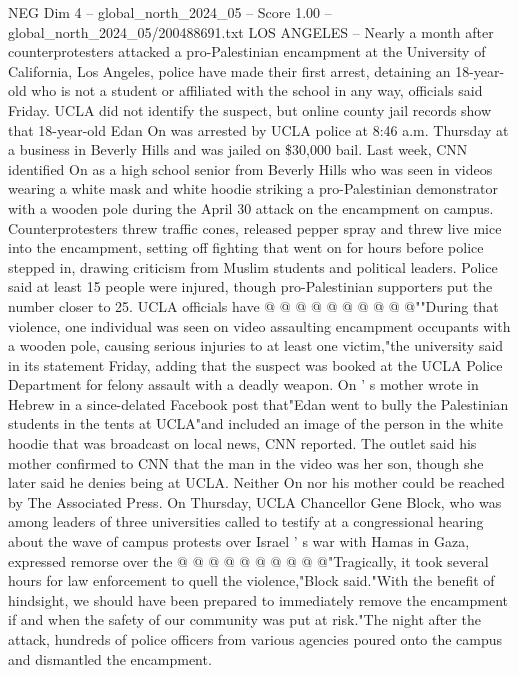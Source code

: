 \begin{textsample}{NEG Dim 4 – global\_north\_2024\_05 – Score 1.00 – global\_north\_2024\_05/200488691.txt}  \label{ex:f4_neg_112}
LOS ANGELES -- Nearly a month after counterprotesters attacked a pro-Palestinian encampment at the University of California, Los Angeles, police have made their first arrest, detaining an 18-year-old who is not a student or affiliated with the school in any way, officials said Friday.
UCLA did not identify the suspect, but online county jail records show that 18-year-old Edan On was arrested by UCLA police at 8:46 a.m.
Thursday at a business in Beverly Hills and was jailed on \$30,000 bail.
Last week, CNN identified On as a high school senior from Beverly Hills who was seen in videos wearing a white mask and white hoodie striking a pro-Palestinian demonstrator with a wooden pole during the April 30 attack on the encampment on campus.
Counterprotesters threw traffic cones, released pepper spray and threw live mice into the encampment, setting off fighting that went on for hours before police stepped in, drawing criticism from Muslim students and political leaders.
Police said at least 15 people were injured, though pro-Palestinian supporters put the number closer to 25.
UCLA officials have @ @ @ @ @ @ @ @ @ @""During that violence, one individual was seen on video assaulting encampment occupants with a wooden pole, causing serious injuries to at least one victim,"the university said in its statement Friday, adding that the suspect was booked at the UCLA Police Department for felony assault with a deadly weapon.
On ' s mother wrote in Hebrew in a since-delated Facebook post that"Edan went to bully the Palestinian students in the tents at UCLA"and included an image of the person in the white hoodie that was broadcast on local news, CNN reported.
The outlet said his mother confirmed to CNN that the man in the video was her son, though she later said he denies being at UCLA.
Neither On nor his mother could be reached by The Associated Press.
On Thursday, UCLA Chancellor Gene Block, who was among leaders of three universities called to testify at a congressional hearing about the wave of campus protests over Israel ' s war with Hamas in Gaza, expressed remorse over the @ @ @ @ @ @ @ @ @ @"Tragically, it took several hours for law enforcement to quell the violence,"Block said."With the benefit of hindsight, we should have been prepared to immediately remove the encampment if and when the safety of our community was put at risk."The night after the attack, hundreds of police officers from various agencies poured onto the campus and dismantled the encampment.

\end{textsample}

